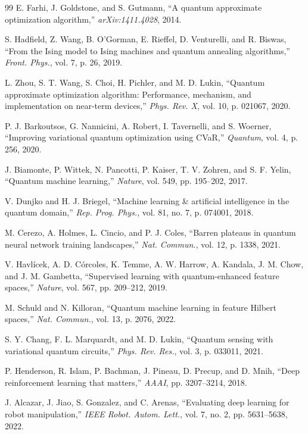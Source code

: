 \documentclass[conference]{IEEEtran}
\begin{document}
\begin{thebibliography}{99}
 E. Farhi, J. Goldstone, and S. Gutmann, ``A quantum approximate optimization algorithm,'' \textit{arXiv:1411.4028}, 2014.

 S. Hadfield, Z. Wang, B. O'Gorman, E. Rieffel, D. Venturelli, and R. Biswas, ``From the Ising model to Ising machines and quantum annealing algorithms,'' \textit{Front. Phys.}, vol. 7, p. 26, 2019.

 L. Zhou, S. T. Wang, S. Choi, H. Pichler, and M. D. Lukin, ``Quantum approximate optimization algorithm: Performance, mechanism, and implementation on near-term devices,'' \textit{Phys. Rev. X}, vol. 10, p. 021067, 2020.

 P. J. Barkoutsos, G. Nannicini, A. Robert, I. Tavernelli, and S. Woerner, ``Improving variational quantum optimization using CVaR,'' \textit{Quantum}, vol. 4, p. 256, 2020.

 J. Biamonte, P. Wittek, N. Pancotti, P. Kaiser, T. V. Zohren, and S. F. Yelin, ``Quantum machine learning,'' \textit{Nature}, vol. 549, pp. 195--202, 2017.

 V. Dunjko and H. J. Briegel, ``Machine learning \& artificial intelligence in the quantum domain,'' \textit{Rep. Prog. Phys.}, vol. 81, no. 7, p. 074001, 2018.

 M. Cerezo, A. Holmes, L. Cincio, and P. J. Coles, ``Barren plateaus in quantum neural network training landscapes,'' \textit{Nat. Commun.}, vol. 12, p. 1338, 2021.

 V. Havl\'icek, A. D. C\'orcoles, K. Temme, A. W. Harrow, A. Kandala, J. M. Chow, and J. M. Gambetta, ``Supervised learning with quantum-enhanced feature spaces,'' \textit{Nature}, vol. 567, pp. 209--212, 2019.

 M. Schuld and N. Killoran, ``Quantum machine learning in feature Hilbert spaces,'' \textit{Nat. Commun.}, vol. 13, p. 2076, 2022.

 S. Y. Chang, F. L. Marquardt, and M. D. Lukin, ``Quantum sensing with variational quantum circuits,'' \textit{Phys. Rev. Res.}, vol. 3, p. 033011, 2021.

 P. Henderson, R. Islam, P. Bachman, J. Pineau, D. Precup, and D. Mnih, ``Deep reinforcement learning that matters,'' \textit{AAAI}, pp. 3207--3214, 2018.

 J. Alcazar, J. Jiao, S. Gonzalez, and C. Arenas, ``Evaluating deep learning for robot manipulation,'' \textit{IEEE Robot. Autom. Lett.}, vol. 7, no. 2, pp. 5631--5638, 2022.


\end{thebibliography}
\end{document}
